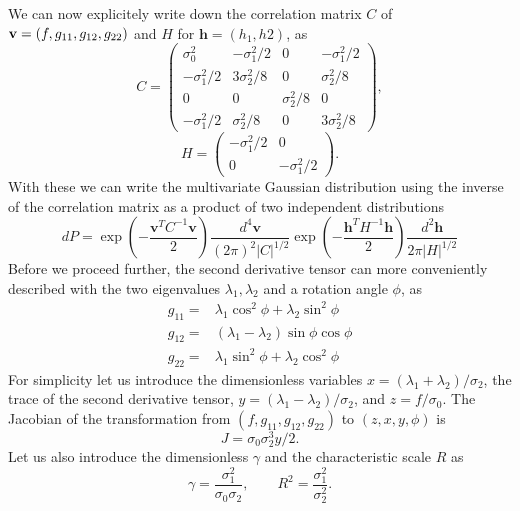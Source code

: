 \documentclass[twocolumn]{emulateapj}
\newcommand{\hh}{\mathbf{h}}
\newcommand{\vv}{\mathbf{v}}
\begin{document}
We can now explicitely write down the correlation matrix $C$ of 
${\bf v} = (f,g_{11},g_{12},g_{22})$ and $H$ for $\hh= (h_1, h2)$, as
\begin{equation}
	 C = \left(
		\begin{array}{cccc}
			\sigma_0^2 & -\sigma_1^2/2 & 0 & -\sigma_1^2/2\\
			-\sigma_1^2/2 & 3\sigma_2^2/8 & 0 & \sigma_2^2/8\\
			  0 & 0 & \sigma_2^2/8  & 0\\
			-\sigma_1^2/2 & \sigma_2^2/8 & 0 & 3\sigma_2^2/8
		 \end{array}\right),
\end{equation}
\begin{equation}
	 H = \left(
		\begin{array}{cccc}
			-\sigma_1^2/2 & 0 \\
			0 & -\sigma_1^2/2
		 \end{array}\right).
\end{equation}
With these we can write the multivariate Gaussian distribution using the inverse 
of the correlation matrix as a product of two independent distributions
\begin{equation}
	dP =\exp\left(-\frac{\vv^T C^{-1}\vv}{2}\right)
  			\frac{d^4 \vv} {(2\pi)^2|C|^{1/2}}
		 \exp\left(-\frac{\hh^T H^{-1} \hh}{2}\right) 
			\frac{d^2 \hh} {2\pi|H|^{1/2}}
\end{equation}
Before we proceed further, the second derivative tensor can more conveniently
described with the two eigenvalues $\lambda_1,\lambda_2$ and a rotation angle 
$\phi$, as
\begin{eqnarray}
	g_{11} =& \lambda_1 \cos^2\phi +\lambda_2 \sin^2\phi\\
	g_{12} =& (\lambda_1-\lambda_2) \sin\phi \cos\phi\\
	g_{22} =& \lambda_1 \sin^2\phi + \lambda_2 \cos^2\phi
\end{eqnarray}
For simplicity let us introduce the dimensionless variables 
$x=(\lambda_1+\lambda_2)/\sigma_2$, the trace of the second derivative tensor, 
$y=(\lambda_1-\lambda_2)/\sigma_2$, and $z = f/\sigma_0$. The Jacobian of the 
transformation from $(f,g_{11},g_{12},g_{22})$ to $(z,x,y,\phi)$ is
\begin{equation}
		J = \sigma_0\sigma_2^3 y/2.  
\end{equation} 
Let us also introduce the dimensionless $\gamma$ and the characteristic scale 
$R$ as
\begin{equation}
	\gamma = \frac{\sigma_1^2}{\sigma_0\sigma_2},
		\qquad R^2 = \frac{\sigma_1^2}{\sigma_2^2}.
\end{equation}
\end{document}
